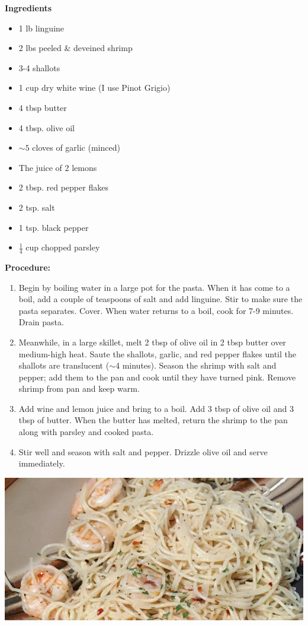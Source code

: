 \begin{multicols}{2}
\textbf{Ingredients}
\begin{itemize}
\item 1 lb linguine\quad
\item 2 lbs peeled \& deveined shrimp
\item 3-4 shallots
\item 1 cup dry white wine (I use Pinot Grigio)
\item 4 tbsp butter
\item 4 tbsp. olive oil
\item $\sim 5$ cloves of garlic (minced)
\item The juice of 2 lemons
\item 2 tbsp. red pepper flakes
\item 2 tsp. salt
\item 1 tsp. black pepper
\item $\frac{1}{4}$ cup chopped parsley 



\end{itemize}


\columnbreak
\textbf{Procedure:}
\medskip


\begin{enumerate}
\item Begin by boiling water in a large pot for the pasta. When it has come to a boil, add a couple of teaspoons of salt and add linguine. Stir to make sure the pasta separates. Cover. When water returns to a boil, cook for 7-9 minutes. Drain pasta. 


\medskip
\item Meanwhile, in a large skillet, melt 2 tbsp of olive oil in 2 tbsp butter over medium-high heat. Saute the shallots, garlic, and red pepper flakes until the shallots are translucent ($\sim$4 minutes). Season the shrimp with salt and pepper; add them to the pan and cook until they have turned pink. Remove shrimp from pan and keep warm. 
\medskip

\item Add wine and lemon juice and bring to a boil. Add 3 tbsp of olive oil and 3 tbsp of butter. When the butter has melted, return the shrimp to the pan along with parsley and cooked pasta. 
\newline 

 \item Stir well and season with salt and pepper. Drizzle olive oil and serve immediately.   

\end{enumerate}
\end{multicols}


\begin{center}
\includegraphics[scale=0.65]{Pasta/Shrimp Scampi/Shrimp Scampi.jpg}
\end{center}
